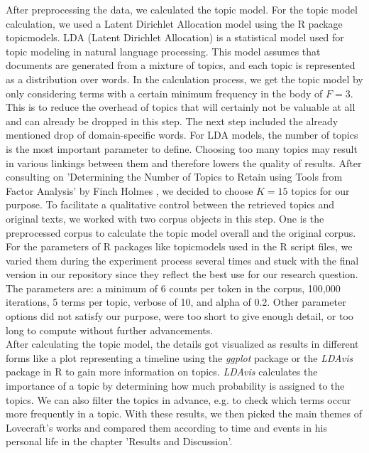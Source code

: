 After preprocessing the data, we calculated the topic model. For the topic model calculation, 
we used a Latent Dirichlet Allocation model using the R package topicmodels. LDA (Latent Dirichlet 
Allocation) is a statistical model used for topic modeling in natural language processing. This 
model assumes that documents are generated from a mixture of topics, and each topic is represented 
as a distribution over words. In the calculation process, we get the topic model by only 
considering terms with a certain minimum frequency in the body of $F=3$. This is to reduce the 
overhead of topics that will certainly not be valuable at all and can already be dropped in 
this step. The next step included the already mentioned drop of domain-specific words. For LDA 
models, the number of topics is the most important parameter to define. Choosing too many topics 
may result in various linkings between them and therefore lowers the quality of results. 
After consulting on 'Determining the Number of Topics to Retain using Tools from Factor Analysis' 
by Finch Holmes \cite{holmes}, we decided to choose $K=15$ topics for our purpose. To facilitate a qualitative 
control between the retrieved topics and original texts, we worked with two corpus objects in 
this step. One is the preprocessed corpus to calculate the topic model overall and the original 
corpus. For the parameters of R packages like topicmodels used in the R script files, we varied 
them during the experiment process several times and stuck with the final version in our repository 
since they reflect the best use for our research question. The parameters are: a minimum of 6 
counts per token in the corpus, 100,000 iterations, 5 terms per topic, verbose of 10, and alpha 
of 0.2. Other parameter options did not satisfy our purpose, were too short to give enough detail, 
or too long to compute without further advancements.\\

After calculating the topic model, the details got visualized as results in different forms 
like a plot representing a timeline using the \textit{ggplot} package or the \textit{LDAvis} package 
in R to gain more information on topics. \textit{LDAvis} calculates the importance of a topic by determining 
how much probability is assigned to the topics. We can also filter the topics in advance, e.g. 
to check which terms occur more frequently in a topic. With these results, we then picked the 
main themes of Lovecraft's works and compared them according to time and events in his personal 
life in the chapter 'Results and Discussion'.

